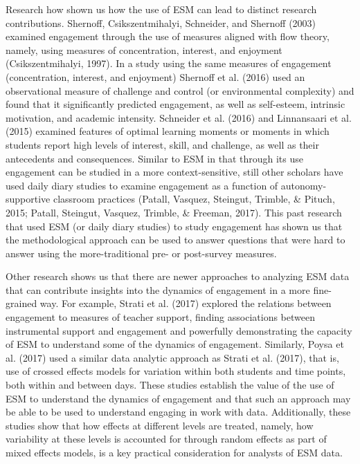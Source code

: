 \documentclass[]{book}
\theoremstyle{definition}
\theoremstyle{definition}
\theoremstyle{definition}
\theoremstyle{remark}
\begin{document}
Research how shown us how the use of ESM can lead to distinct research
contributions. Shernoff, Csikszentmihalyi, Schneider, and Shernoff
(2003) examined engagement through the use of measures aligned with flow
theory, namely, using measures of concentration, interest, and enjoyment
(Csikszentmihalyi, 1997). In a study using the same measures of
engagement (concentration, interest, and enjoyment) Shernoff et al.
(2016) used an observational measure of challenge and control (or
environmental complexity) and found that it significantly predicted
engagement, as well as self-esteem, intrinsic motivation, and academic
intensity. Schneider et al. (2016) and Linnansaari et al. (2015)
examined features of optimal learning moments or moments in which
students report high levels of interest, skill, and challenge, as well
as their antecedents and consequences. Similar to ESM in that through
its use engagement can be studied in a more context-sensitive, still
other scholars have used daily diary studies to examine engagement as a
function of autonomy-supportive classroom practices (Patall, Vasquez,
Steingut, Trimble, \& Pituch, 2015; Patall, Steingut, Vasquez, Trimble,
\& Freeman, 2017). This past research that used ESM (or daily diary
studies) to study engagement has shown us that the methodological
approach can be used to answer questions that were hard to answer using
the more-traditional pre- or post-survey measures.

Other research shows us that there are newer approaches to analyzing ESM
data that can contribute insights into the dynamics of engagement in a
more fine-grained way. For example, Strati et al. (2017) explored the
relations between engagement to measures of teacher support, finding
associations between instrumental support and engagement and powerfully
demonstrating the capacity of ESM to understand some of the dynamics of
engagement. Similarly, Poysa et al. (2017) used a similar data analytic
approach as Strati et al. (2017), that is, use of crossed effects models
for variation within both students and time points, both within and
between days. These studies establish the value of the use of ESM to
understand the dynamics of engagement and that such an approach may be
able to be used to understand engaging in work with data. Additionally,
these studies show that how effects at different levels are treated,
namely, how variability at these levels is accounted for through random
effects as part of mixed effects models, is a key practical
consideration for analysts of ESM data.
\end{document}
